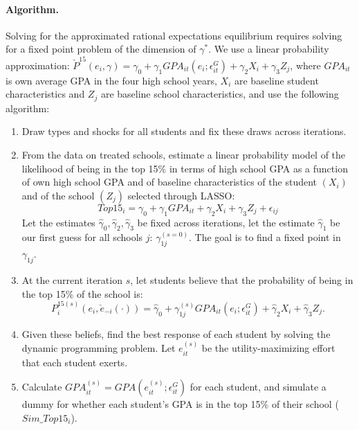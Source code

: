 \paragraph{Algorithm.} Solving for the approximated rational expectations equilibrium requires solving for a fixed point problem of the dimension of $\gamma^{*}$.  We use a linear probability approximation: $\check{P}^{15}(e_i,\gamma)=\gamma_0+\gamma_1 GPA_{it}(e_i;\epsilon_{it}^G)+\gamma_2 X_i + \gamma_3 Z_j$, where $GPA_{it}$ is own average GPA in the four high school years, $X_i$ are baseline student characteristics and $Z_j$ are baseline school characteristics, and use the following algorithm:


\begin{enumerate}[leftmargin=5.5mm]\setlength\itemsep{0.0em}
	\item Draw types and shocks for all students and fix these draws across iterations.
	\item From the data on treated schools, estimate a linear probability model of the likelihood of being in the top 15\% in terms of high school GPA as a function of own high school GPA and of baseline characteristics of the student $(X_{i})$ and of the school $(Z_j)$ selected through LASSO:
	\begin{equation*}
		Top15_i=\gamma_{0}+\gamma_{1}GPA_{it}+\gamma_{2}X_{i}+\gamma_{3}Z_j+\epsilon_{ij}
	\end{equation*}
	Let the estimates $\hat{\gamma}_{0},\hat{\gamma}_{2},\hat{\gamma}_{3}$ be fixed across iterations, let the estimate $\hat{\gamma}_{1}$ be our first guess for all schools $j$: $\gamma_{1j}^{(s=0)}$. The goal is to find a fixed point in $\gamma_{1j}$.\par

	\item At the current iteration $s$, let students believe that the probability of being in the top 15\% of the school is:
	\begin{equation*}
		P_i^{15(s)}(e_i,\check{e}_{-i}(\cdot))=\hat{\gamma}_{0}+\gamma_{1j}^{(s)}GPA_{it}(e_i;\epsilon_{it}^G)+ \hat{\gamma}_{2}X_{i}+\hat{\gamma}_{3}Z_j.
	\end{equation*}
	\item Given these beliefs, find the best response of each student by solving the dynamic programming problem. Let $e_{it}^{(s)}$ be the utility-maximizing effort that each student exerts.
	\item Calculate $GPA_{it}^{(s)}=GPA(e_{it}^{(s)};\epsilon_{it}^G)$ for each student, and simulate a dummy for whether each student's GPA is in the top 15\% of their school ($Sim\_Top15_i$). 


\end{enumerate}
